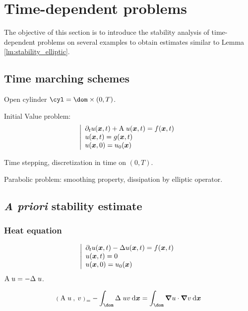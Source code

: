 
\chapter{Time-dependent problems}

The objective of this section is to introduce the \apriori stability analysis of time-dependent problems on several examples to obtain estimates similar to Lemma \ref{lm:stability_elliptic}.

\section{Time marching schemes}

Open cylinder $\cyl = \dom \times (0,T)$.

Initial Value problem:
\begin{equation*}
\left\lvert
\begin{array}{l}
\partial_t u({{\boldsymbol x}},t) + {\mathrm A}\;u({{\boldsymbol x}},t) = f({{\boldsymbol x}},t) \\
u({{\boldsymbol x}},t) = g({{\boldsymbol x}},t) \\
u({{\boldsymbol x}},0) = u_0({{\boldsymbol x}})
\end{array}
\right.
\end{equation*}

Time stepping, discretization in time on $(0,T)$.

Parabolic problem: smoothing property, dissipation by elliptic operator.

\section{\textit{A priori} stability estimate}

\subsection{Heat equation}

\begin{equation*}
\left\lvert
\begin{array}{l}
\partial_t u({{\boldsymbol x}},t) - \Delta u({{\boldsymbol x}},t) = f({{\boldsymbol x}},t) \\
u({{\boldsymbol x}},t) = 0 \\
u({{\boldsymbol x}},0) = u_0({{\boldsymbol x}})
\end{array}
\right.
\end{equation*}
${\mathrm A}\;u = - \Delta\;u$.

\begin{equation*}
\InnerP{\matA\;u}{v} = - \int_\dom \Delta\;u v \dxd = \int_\dom \Grad u \cdot \Grad v \dxd
\end{equation*}

